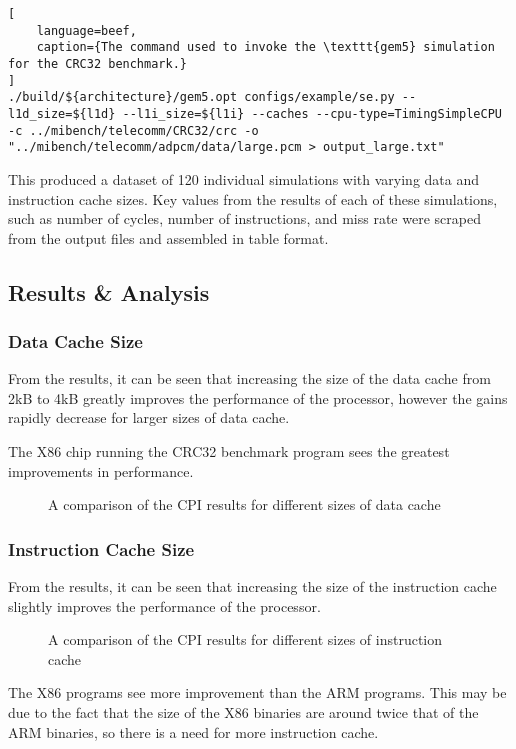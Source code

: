 \begin{lstlisting}[
    language=beef,
    caption={The command used to invoke the \texttt{gem5} simulation for the CRC32 benchmark.}
]
./build/${architecture}/gem5.opt configs/example/se.py --l1d_size=${l1d} --l1i_size=${l1i} --caches --cpu-type=TimingSimpleCPU -c ../mibench/telecomm/CRC32/crc -o "../mibench/telecomm/adpcm/data/large.pcm > output_large.txt"
\end{lstlisting}

This produced a dataset of 120 individual simulations with varying data and instruction
cache sizes.
Key values from the results of each of these simulations, such as number of cycles,
number of instructions, and miss rate were scraped from the output files and assembled
in table format.

\subsection{Results \& Analysis}

\subsubsection{Data Cache Size}

From the results, it can be seen that increasing the size of the data cache from 2kB to
4kB greatly improves the performance of the processor, however the gains rapidly
decrease for larger sizes of data cache.

The X86 chip running the CRC32 benchmark program sees the greatest improvements in
performance.

\begin{figure}[H]
    \centering
    
    \caption{A comparison of the CPI results for different sizes of data cache}
    \label{fig:parta-l1d}
\end{figure}

\subsubsection{Instruction Cache Size}

From the results, it can be seen that increasing the size of the instruction cache
slightly improves the performance of the processor.

\begin{figure}[H]
    \centering
    
    \caption{A comparison of the CPI results for different sizes of instruction cache}
    \label{fig:parta-l1i}
\end{figure}

The X86 programs see more improvement than the ARM programs.
This may be due to the fact that the size of the X86 binaries are around twice that of
the ARM binaries, so there is a need for more instruction cache.
